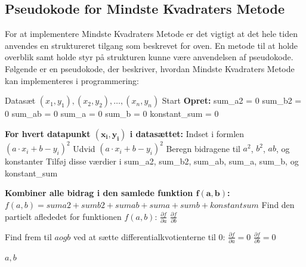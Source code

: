 \subsection{Pseudokode for Mindste Kvadraters Metode}\label{sec:Pseudokode}
For at implementere Mindste Kvadraters Metode er det vigtigt at det hele tiden anvendes en struktureret tilgang som beskrevet for oven. En metode til at holde overblik samt holde styr på strukturen kunne være anvendelsen af pseudokode. Følgende er en pseudokode, der beskriver, hvordan Mindste Kvadraters Metode kan implementeres i programmering:
\begin{algorithmic}[1] 
        \REQUIRE Datasæt \((x_1, y_1), (x_2, y_2), \dots, (x_n, y_n)\)
        \STATE Start
        \STATE \textbf{Opret:}
        \STATE \hspace{0.5cm} sum\_a2 = 0 
        \STATE \hspace{0.5cm} sum\_b2 = 0  
        \STATE \hspace{0.5cm} sum\_ab = 0  
        \STATE \hspace{0.5cm} sum\_a = 0   
        \STATE \hspace{0.5cm} sum\_b = 0  
        \STATE \hspace{0.5cm} konstant\_sum = 0
        
        \STATE \textbf{For hvert datapunkt $\mathbf{(x_i, y_i)}$ i datasættet:}
        \STATE Indset i formlen $(a \cdot x_i + b - y_i)^2$
        \STATE \hspace{0.5cm} Udvid \((a \cdot x_i + b - y_i)^2\)
        \STATE \hspace{0.5cm} Beregn bidragene til \(a^2\), \(b^2\), \(ab\), og konstanter
        \STATE \hspace{0.5cm} Tilføj disse værdier i sum\_a2, sum\_b2, sum\_ab, sum\_a, sum\_b, og konstant\_sum
        
        \STATE \textbf{Kombiner alle bidrag i den samlede funktion $\mathbf{f(a,b) }$:}
        \STATE \hspace{0.5cm} $f(a, b) = sum a2 + sum b2 + sum ab + sum a + sum b + konstant sum$        
        \STATE Find den partielt aflededet for funktionen $f(a, b)$:
        \STATE \hspace{0.5cm} $\frac{\partial f}{\partial a}$
        \STATE \hspace{0.5cm} $\frac{\partial f}{\partial b}$
        
        \STATE Find frem til $a og b$ ved at sætte differentialkvotienterne til 0:
        \STATE \hspace{0.5cm} \(\frac{\partial f}{\partial a} = 0\)
        \STATE \hspace{0.5cm} \(\frac{\partial f}{\partial b} = 0\)
        
        \RETURN \(a, b\)
\end{algorithmic}
